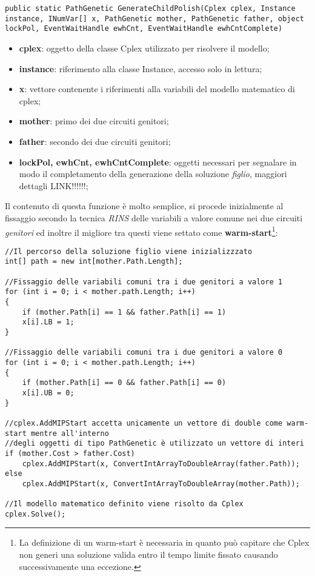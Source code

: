 \documentclass[11pt]{article}
\begin{document}
\begin{lstlisting}
public static PathGenetic GenerateChildPolish(Cplex cplex, Instance instance, INumVar[] x, PathGenetic mother, PathGenetic father, object lockPol, EventWaitHandle ewhCnt, EventWaitHandle ewhCntComplete)
\end{lstlisting}

\begin{itemize}
    \item \textbf{cplex}: oggetto della classe Cplex utilizzato per risolvere il modello;
    \item \textbf{instance}: riferimento alla classe Instance, accesso solo in lettura;
    \item \textbf{x}: vettore contenente i riferimenti alla variabili del modello matematico di cplex;
    \item \textbf{mother}: primo dei due circuiti genitori;
    \item \textbf{father}: secondo dei due circuiti genitori;
    \item \textbf{lockPol, ewhCnt, ewhCntComplete}: oggetti necessari per segnalare in modo il completamento della generazione della soluzione \textit{figlio}, maggiori dettagli LINK!!!!!!;
\end{itemize}

Il contenuto di questa funzione è molto semplice, si procede inizialmente al fissaggio secondo la tecnica \textit{RINS} delle variabili a valore comune nei due circuiti \textit{genitori} ed inoltre il migliore tra questi viene settato come \textbf{warm-start}\footnote{La definizione di un warm-start è necessaria in quanto può capitare che Cplex non generi una soluzione valida entro il tempo limite fissato causando successivamente una eccezione.}:

\begin{lstlisting}
//Il percorso della soluzione figlio viene inizializzzato
int[] path = new int[mother.Path.Length];

//Fissaggio delle variabili comuni tra i due genitori a valore 1
for (int i = 0; i < mother.path.Length; i++)
{
    if (mother.Path[i] == 1 && father.Path[i] == 1)
    x[i].LB = 1;
}

//Fissaggio delle variabili comuni tra i due genitori a valore 0
for (int i = 0; i < mother.path.Length; i++)
{
    if (mother.Path[i] == 0 && father.Path[i] == 0)
    x[i].UB = 0;
}

//cplex.AddMIPStart accetta unicamente un vettore di double come warm-start mentre all'interno
//degli oggetti di tipo PathGenetic è utilizzato un vettore di interi
if (mother.Cost > father.Cost)
    cplex.AddMIPStart(x, ConvertIntArrayToDoubleArray(father.Path));
else
    cplex.AddMIPStart(x, ConvertIntArrayToDoubleArray(mother.Path));
    
//Il modello matematico definito viene risolto da Cplex
cplex.Solve();
\end{lstlisting}
\end{document}
